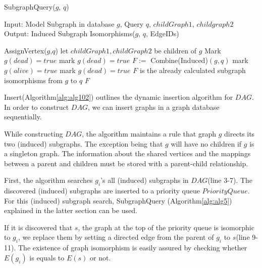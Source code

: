 \begin{algorithm}
\caption{SubgraphQuery($g$, $q$)}
\label{alg:alg106}
\begin{algorithmic}
\STATE Input: Model Subgraph in database  $g$, Query $q$, $childGraph1$, $childgraph2$
\STATE Output: Induced Subgraph Isomorphisms($g$, $q$, EdgeIDs)
\end{algorithmic}
\begin{algorithmic}[1]
        \STATE AssignVertex($g$,$q$)
      \ELSE 
         \STATE let $childGraph1,childGraph2$ be children of $g$
          \STATE Mark $g(dead)=true$
			\STATE mark $g(dead)=true$
		\ELSE
			\STATE $F :=$ Combine(Induced)$(g,q)$
		\ENDIF
	\ENDIF
		\STATE mark $g(alive)=true$
	\ELSE
		\STATE mark  $g(dead)=true$
	\ENDIF
\ELSE
	\STATE $F$ is the already calculated subgraph isomorphisms from $g$ to $q$
\ENDIF
\RETURN $F$
          
\end{algorithmic}
\end{algorithm}


Insert(Algorithm\ref{alg:alg102}) outlines the dynamic insertion algorithm for $DAG$. In order to construct $DAG$, we can insert graphs in a graph database 
sequentially.

While constructing $DAG$, the algorithm maintains a rule that graph $g$ directs its two (induced) subgraphs.
The exception being that $g$ will have no children if $g$ is a singleton graph.
The information about the shared vertices and the mappings between a parent and children must be stored with a parent-child relationship.

First, the algorithm searches $g_i$'s all (induced) subgraphs in $DAG$(line 3-7).
The discovered (induced) subgraphs are inserted to a priority queue $PriorityQueue$.
For this (induced) subgraph search, SubgraphQuery (Algorithm\ref{alg:alg5}) explained in the latter section can be used.

If it is discovered that  $s$, the graph at the top of the priority queue is isomorphic to $g_i$,
we replace them by setting a directed edge from the parent of $g_i$ to $s$(line 9-11).
The existence of graph isomorphism is easily assured by checking whether $E(g_i)$ is equals to $E(s)$ or not.

